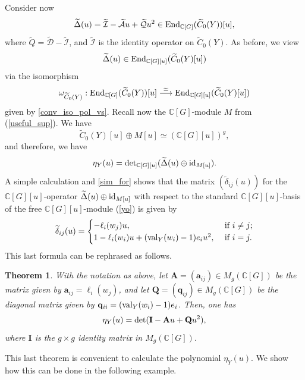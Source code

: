 \documentclass[11pt]{amsart}
\newtheorem{theorem}{Theorem}[section]
\numberwithin{equation}{section}
\theoremstyle{remark}
\theoremstyle{definition}
\begin{document}
Consider now
$$\widetilde{\Delta}(u) = \widetilde{\mathcal{I}} - \widetilde{\mathcal{A}}u + \widetilde{\mathcal{Q}}u^{2} \in {\rm End}_{\mathbb{C}[G]}(\widetilde{C}_{0}(Y))[u], $$
where $\widetilde{Q} = \widetilde{\mathcal{D}}- \widetilde{\mathcal{I}}$, and $\widetilde{\mathcal{I}}$ is the identity operator on $\widetilde{C}_{0}(Y)$.  As before, we view 
$$\widetilde{\Delta}(u) \in {\rm End}_{\mathbb{C}[G][u]}(\widetilde{C}_{0}(Y)[u])$$ 
via the isomorphism
$$\omega_{\widetilde{C}_{0}(Y)}:{\rm End}_{\mathbb{C}[G]}(\widetilde{C}_{0}(Y))[u] \stackrel{\simeq}{\longrightarrow} {\rm End}_{\mathbb{C}[G][u]}(\widetilde{C}_{0}(Y)[u]) $$
given by \cref{conv_iso_pol_vs}.  Recall now the $\mathbb{C}[G]$-module $M$ from (\ref{useful_sup}).  We have 
\begin{equation} \label{yo}
\widetilde{C}_{0}(Y)[u] \oplus M[u] \simeq (\mathbb{C}[G][u])^{g}, 
\end{equation}
and therefore, we have
$$\eta_{Y}(u) = {\rm det}_{\mathbb{C}[G][u]}(\widetilde{\Delta}(u) \oplus {\rm id}_{M[u]}). $$
A simple calculation and \cref{sim_for} shows that the matrix $(\widetilde{\delta}_{ij}(u))$ for the $\mathbb{C}[G][u]$-operator $\widetilde{\Delta}(u) \oplus {\rm id}_{M[u]}$ with respect to the standard $\mathbb{C}[G][u]$-basis of the free $\mathbb{C}[G][u]$-module (\ref{yo}) is given by
\begin{equation*}
\widetilde{\delta}_{ij}(u) =
\begin{cases}
- \ell_{i}(w_{j})u, &\text{ if } i \neq j;\\
1 - \ell_{i}(w_{i})u + ({\rm val}_{Y}(w_{i}) - 1)e_{i}u^{2}, &\text{ if } i=j.
\end{cases}
\end{equation*}
This last formula can be rephrased as follows.
\begin{theorem} \label{equi_exp}
With the notation as above, let $\mathbf{A} = (\mathbf{a}_{ij}) \in M_{g}(\mathbb{C}[G])$ be the matrix given by $\mathbf{a}_{ij} = \ell_{i}(w_{j})$, and let $\mathbf{Q} = (\mathbf{q}_{ij}) \in M_{g}(\mathbb{C}[G])$ be the diagonal matrix given by $\mathbf{q}_{ii} = ({\rm val}_{Y}(w_{i}) - 1)e_{i}$.  Then, one has
$$\eta_{Y}(u) = {\rm det}(\mathbf{I} - \mathbf{A}u + \mathbf{Q}u^{2}), $$
where $\mathbf{I}$ is the $g \times g$ identity matrix in $M_{g}(\mathbb{C}[G])$.
\end{theorem}
This last theorem is convenient to calculate the polynomial $\eta_{Y}(u)$.  We show how this can be done in the following example. 
\end{document}
